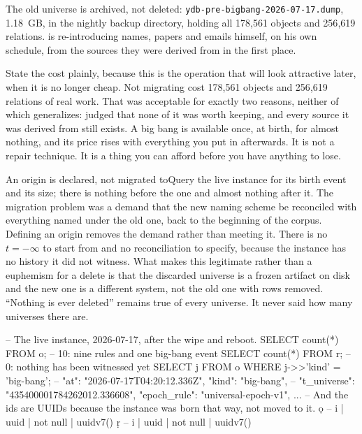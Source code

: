 The old universe is archived, not deleted: \texttt{ydb-pre-bigbang-2026-07-17.dump}, 1.18~GB, in the nightly backup directory, holding all 178{,}561 objects and 256{,}619 relations. \labPI is re-introducing names, papers and emails himself, on his own schedule, from the sources they were derived from in the first place.

State the cost plainly, because this is the operation that will look attractive later, when it is no longer cheap. Not migrating cost 178{,}561 objects and 256{,}619 relations of real work. That was acceptable for exactly two reasons, neither of which generalizes: \labPI judged that none of it was worth keeping, and every source it was derived from still exists. A big bang is available once, at birth, for almost nothing, and its price rises with everything you put in afterwards. It is not a repair technique. It is a thing you can afford before you have anything to lose.

\begin{Correspondence}{An origin is declared, not migrated to}{Query the live instance for its birth event and its size; there is nothing before the one and almost nothing after it.}
The migration problem was a demand that the new naming scheme be reconciled with everything named under the old one, back to the beginning of the corpus. Defining an origin removes the demand rather than meeting it. There is no $t=-\infty$ to start from and no reconciliation to specify, because the instance has no history it did not witness. What makes this legitimate rather than a euphemism for a delete is that the discarded universe is a frozen artifact on disk and the new one is a different system, not the old one with rows removed. ``Nothing is ever deleted'' remains true of every universe. It never said how many universes there are.
\begin{Check}
-- The live instance, 2026-07-17, after the wipe and reboot.
SELECT count(*) FROM o;   -- 10: nine rules and one big-bang event
SELECT count(*) FROM r;   -- 0:  nothing has been witnessed yet
SELECT j FROM o WHERE j->>'kind' = 'big-bang';
--   {"at": "2026-07-17T04:20:12.336Z", "kind": "big-bang",
--    "t_universe": "435400001784262012.336608", "epoch_rule": "universal-epoch-v1", ...}
-- And the ids are UUIDs because the instance was born that way, not moved to it.
\d o   -- i | uuid | not null | uuidv7()
\d r   -- i | uuid | not null | uuidv7()
\end{Check}
\end{Correspondence}

